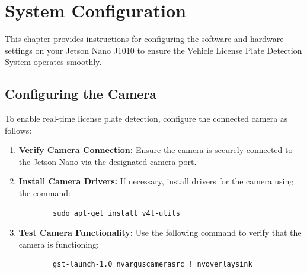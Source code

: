 %
%

\chapter{System Configuration}

This chapter provides instructions for configuring the software and hardware settings on your Jetson Nano J1010 to ensure the Vehicle License Plate Detection System operates smoothly.

\section{Configuring the Camera}
To enable real-time license plate detection, configure the connected camera as follows:

\begin{enumerate}
	\item \textbf{Verify Camera Connection:} Ensure the camera is securely connected to the Jetson Nano via the designated camera port.
	\item \textbf{Install Camera Drivers:} If necessary, install drivers for the camera using the command:
	\begin{verbatim}
		sudo apt-get install v4l-utils
	\end{verbatim}
	\item \textbf{Test Camera Functionality:} Use the following command to verify that the camera is functioning:
	\begin{verbatim}
		gst-launch-1.0 nvarguscamerasrc ! nvoverlaysink
	\end{verbatim}
\end{enumerate}

%
%

